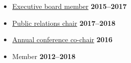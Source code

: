 \documentclass[margin]{res}
\begin{document}
\begin{resume}
\begin{itemize}\itemsep -2pt
    \item[] \href{http://gradphysics.nd.edu/about-us/executive-board/}{Executive board member} \hfill {\bf 2015--2017}
    \item[] \href{http://gradphysics.nd.edu/about-us/committee-chairs/}{Public relations chair} \hfill {\bf 2017--2018}
    \item[] \href{http://gradphysics.nd.edu/conference/gpsac-2016/}{Annual conference co-chair}
    \hfill {\bf 2016}
    \item[] Member \hfill {\bf 2012--2018}
\end{itemize} \vspace{-12pt}

\end{resume}
\end{document}

